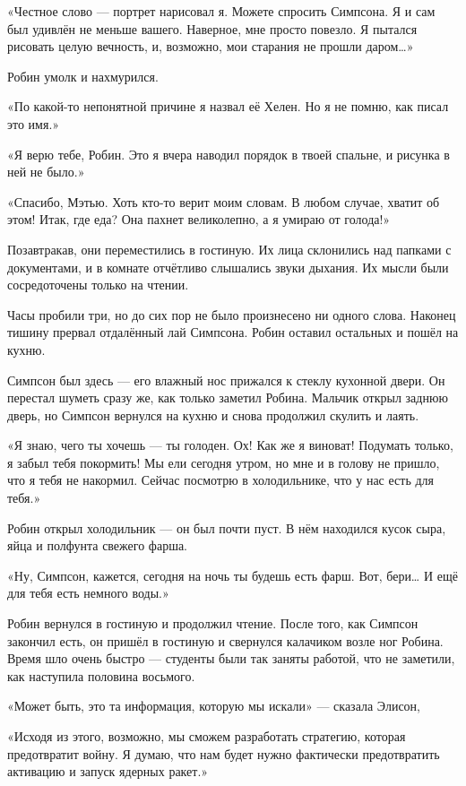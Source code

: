 \documentclass[a5paper, 9pt,
final, openany, twoside=true]{memoir}
\begin{document}
«Честное слово — портрет нарисовал я. Можете спросить Симпсона. Я и сам был удивлён не меньше вашего. Наверное, мне просто повезло. Я пытался рисовать целую вечность, и, возможно, мои старания не прошли даром…»

Робин умолк и нахмурился.

«По какой-то непонятной причине я назвал её Хелен. Но я не помню, как писал это имя.»

«Я верю тебе, Робин. Это я вчера наводил порядок в твоей спальне, и рисунка в ней не было.»

«Спасибо, Мэтью. Хоть кто-то верит моим словам. В любом случае, хватит об этом! Итак, где еда? Она пахнет великолепно, а я умираю от голода!»\bigskip

Позавтракав, они переместились в гостиную. Их лица склонились над папками с документами, и в комнате отчётливо слышались звуки дыхания. Их мысли были сосредоточены только на чтении.

Часы пробили три, но до сих пор не было произнесено ни одного слова. Наконец тишину прервал отдалённый лай Симпсона. Робин оставил остальных и пошёл на кухню.

Симпсон был здесь — его влажный нос прижался к стеклу кухонной двери. Он перестал шуметь сразу же, как только заметил Робина. Мальчик открыл заднюю дверь, но Симпсон вернулся на кухню и снова продолжил скулить и лаять.

«Я знаю, чего ты хочешь — ты голоден. Ох! Как же я виноват! Подумать только, я забыл тебя покормить! Мы ели сегодня утром, но мне и в голову не пришло, что я тебя не накормил. Сейчас посмотрю в холодильнике, что у нас есть для тебя.»

Робин открыл холодильник — он был почти пуст. В нём находился кусок сыра, яйца и полфунта свежего фарша.

«Ну, Симпсон, кажется, сегодня на ночь ты будешь есть фарш. Вот, бери… И ещё для тебя есть немного воды.»

Робин вернулся в гостиную и продолжил чтение. После того, как Симпсон закончил есть, он пришёл в гостиную и свернулся калачиком возле ног Робина. Время шло очень быстро — студенты были так заняты работой, что не заметили, как наступила половина восьмого.

«Может быть, это та информация, которую мы искали» — сказала Элисон,

«Исходя из этого, возможно, мы сможем разработать стратегию, которая предотвратит войну. Я думаю, что нам будет нужно фактически предотвратить активацию и запуск ядерных ракет.»
\end{document}

